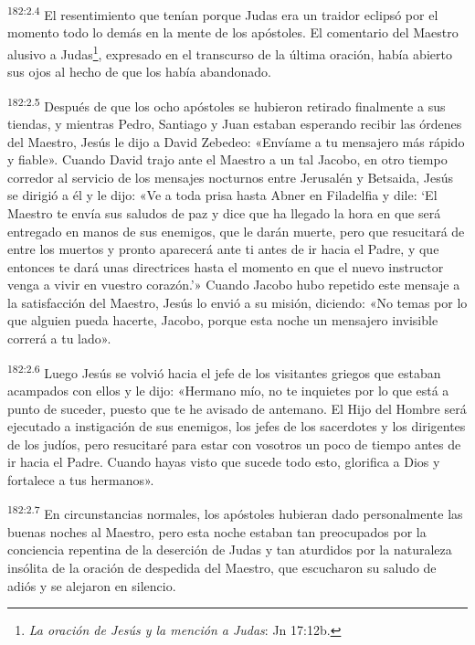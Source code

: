 \par 
\textsuperscript{182:2.4} El resentimiento que tenían porque Judas era un traidor eclipsó por el momento todo lo demás en la mente de los apóstoles. El comentario del Maestro alusivo a Judas\footnote{\textit{La oración de Jesús y la mención a Judas}: Jn 17:12b.}, expresado en el transcurso de la última oración, había abierto sus ojos al hecho de que los había abandonado.

\par 
\textsuperscript{182:2.5} Después de que los ocho apóstoles se hubieron retirado finalmente a sus tiendas, y mientras Pedro, Santiago y Juan estaban esperando recibir las órdenes del Maestro, Jesús le dijo a David Zebedeo: «Envíame a tu mensajero más rápido y fiable». Cuando David trajo ante el Maestro a un tal Jacobo, en otro tiempo corredor al servicio de los mensajes nocturnos entre Jerusalén y Betsaida, Jesús se dirigió a él y le dijo: «Ve a toda prisa hasta Abner en Filadelfia y dile: `El Maestro te envía sus saludos de paz y dice que ha llegado la hora en que será entregado en manos de sus enemigos, que le darán muerte, pero que resucitará de entre los muertos y pronto aparecerá ante ti antes de ir hacia el Padre, y que entonces te dará unas directrices hasta el momento en que el nuevo instructor venga a vivir en vuestro corazón.'» Cuando Jacobo hubo repetido este mensaje a la satisfacción del Maestro, Jesús lo envió a su misión, diciendo: «No temas por lo que alguien pueda hacerte, Jacobo, porque esta noche un mensajero invisible correrá a tu lado».

\par 
\textsuperscript{182:2.6} Luego Jesús se volvió hacia el jefe de los visitantes griegos que estaban acampados con ellos y le dijo: «Hermano mío, no te inquietes por lo que está a punto de suceder, puesto que te he avisado de antemano. El Hijo del Hombre será ejecutado a instigación de sus enemigos, los jefes de los sacerdotes y los dirigentes de los judíos, pero resucitaré para estar con vosotros un poco de tiempo antes de ir hacia el Padre. Cuando hayas visto que sucede todo esto, glorifica a Dios y fortalece a tus hermanos».

\par 
\textsuperscript{182:2.7} En circunstancias normales, los apóstoles hubieran dado personalmente las buenas noches al Maestro, pero esta noche estaban tan preocupados por la conciencia repentina de la deserción de Judas y tan aturdidos por la naturaleza insólita de la oración de despedida del Maestro, que escucharon su saludo de adiós y se alejaron en silencio.

